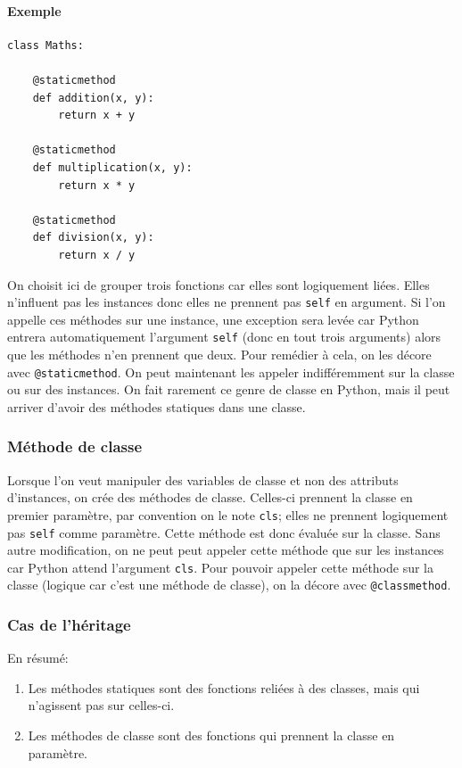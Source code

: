 \documentclass[a4paper, 10pt]{article}
\begin{document}
\paragraph{Exemple}
\begin{verbatim}
class Maths:

    @staticmethod
    def addition(x, y):
        return x + y

    @staticmethod
    def multiplication(x, y):
        return x * y

    @staticmethod
    def division(x, y):
        return x / y
\end{verbatim}
On choisit ici de grouper trois fonctions car elles sont logiquement liées. Elles n'influent pas les instances donc elles ne prennent pas \texttt{self} en argument. Si l'on appelle ces méthodes sur une instance, une exception sera levée car Python entrera automatiquement l'argument \texttt{self} (donc en tout trois arguments) alors que les méthodes n'en prennent que deux. Pour remédier à cela, on les décore avec \texttt{@staticmethod}. On peut maintenant les appeler indifféremment sur la classe ou sur des instances. On fait rarement ce genre de classe en Python, mais il peut arriver d'avoir des méthodes statiques dans une classe.

\subsubsection{Méthode de classe}
\label{sec:classmethod}
Lorsque l'on veut manipuler des variables de classe et non des attributs d'instances, on crée des méthodes de classe. Celles-ci prennent la classe en premier paramètre, par convention on le note \texttt{cls}; elles ne prennent logiquement pas \texttt{self} comme paramètre. Cette méthode est donc évaluée sur la classe. Sans autre modification, on ne peut peut appeler cette méthode que sur les instances car Python attend l'argument \texttt{cls}. Pour pouvoir appeler cette méthode sur la classe (logique car c'est une méthode de classe), on la décore avec \texttt{@classmethod}.

\subsubsection{Cas de l'héritage}
En résumé:
\begin{enumerate}
        \item Les méthodes statiques sont des fonctions reliées à des classes, mais qui n'agissent pas sur celles-ci.
        \item Les méthodes de classe sont des fonctions qui prennent la classe en paramètre.
\end{enumerate}
\end{document}
